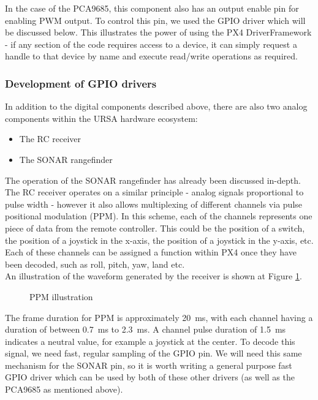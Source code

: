 \documentclass[capstone_report.tex]{subfiles}
\begin{document}
    In the case of the PCA9685, this component also has an output enable pin for enabling PWM output. To control this pin, we used the GPIO driver which will be discussed below. This illustrates the power of using the PX4 DriverFramework - if any section of the code requires access to a device, it can simply request a handle to that device by name and execute read/write operations as required.

    \subsubsection{Development of GPIO drivers}
    In addition to the digital components described above, there are also two analog components within the URSA hardware ecosystem:
    \begin{itemize}
        \item The RC receiver
        \item The SONAR rangefinder 
    \end{itemize}

    The operation of the SONAR rangefinder has already been discussed in-depth. The RC receiver operates on a similar principle - analog signals proportional to pulse width - however it also allows multiplexing of different channels via pulse positional modulation (PPM). In this scheme, each of the channels represents one piece of data from the remote controller. This could be the position of a switch, the position of a joystick in the x-axis, the position of a joystick in the y-axis, etc. Each of these channels can be assigned a function within PX4 once they have been decoded, such as roll, pitch, yaw, land etc.\\

    An illustration of the waveform generated by the receiver is shown at Figure \ref{fig:ppm}.

    \begin{figure}[H]
    \centering
        
        \caption{PPM illustration\label{fig:ppm}}
    \end{figure}

    The frame duration for PPM is approximately \SI{20}{\milli\second}, with each channel having a duration of between \SI{0.7}{\milli\second} to \SI{2.3}{\milli\second}. A channel pulse duration of \SI{1.5}{\milli\second} indicates a neutral value, for example a joystick at the center. To decode this signal, we need fast, regular sampling of the GPIO pin. We will need this same mechanism for the SONAR pin, so it is worth writing a general purpose fast GPIO driver which can be used by both of these other drivers (as well as the PCA9685 as mentioned above).\\
\end{document}
